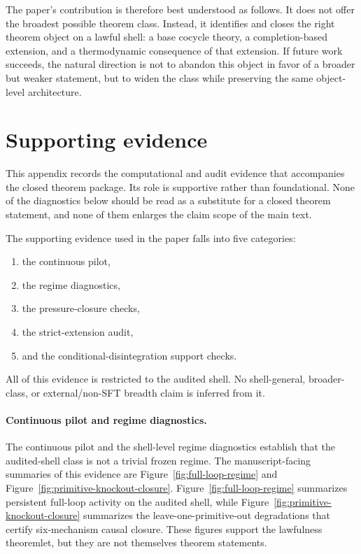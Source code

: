 \documentclass[11pt]{article}
\theoremstyle{definition}
\begin{document}
The paper’s contribution is therefore best understood as follows. It does not offer the broadest possible theorem class. Instead, it identifies and closes the right theorem object on a lawful shell: a base cocycle theory, a completion-based extension, and a thermodynamic consequence of that extension. If future work succeeds, the natural direction is not to abandon this object in favor of a broader but weaker statement, but to widen the class while preserving the same object-level architecture.
 
\appendix
\section{Supporting evidence}\label{sec:appendix-supporting-evidence}

This appendix records the computational and audit evidence that accompanies the closed theorem package. Its role is supportive rather than foundational. None of the diagnostics below should be read as a substitute for a closed theorem statement, and none of them enlarges the claim scope of the main text.

The supporting evidence used in the paper falls into five categories:
\begin{enumerate}
    \item the continuous pilot,
    \item the regime diagnostics,
    \item the pressure-closure checks,
    \item the strict-extension audit,
    \item and the conditional-disintegration support checks.
\end{enumerate}
All of this evidence is restricted to the audited shell. No shell-general, broader-class, or external/non-SFT breadth claim is inferred from it.

\paragraph{Continuous pilot and regime diagnostics.}
The continuous pilot and the shell-level regime diagnostics establish that the audited-shell class is not a trivial frozen regime. The manuscript-facing summaries of this evidence are Figure~\ref{fig:full-loop-regime} and Figure~\ref{fig:primitive-knockout-closure}. Figure~\ref{fig:full-loop-regime} summarizes persistent full-loop activity on the audited shell, while Figure~\ref{fig:primitive-knockout-closure} summarizes the leave-one-primitive-out degradations that certify six-mechanism causal closure. These figures support the lawfulness theoremlet, but they are not themselves theorem statements.
\end{document}
